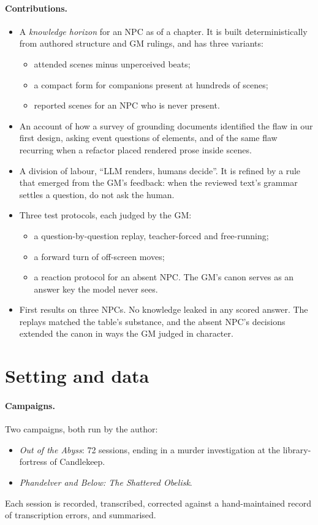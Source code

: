 \documentclass[11pt]{article}
\begin{document}
\paragraph{Contributions.}
\begin{itemize}[nosep]
\item A \emph{knowledge horizon} for an NPC as of a chapter. It is built
deterministically from authored structure and GM rulings, and has three variants:
\begin{itemize}[nosep]
\item attended scenes minus unperceived beats;
\item a compact form for companions present at hundreds of scenes;
\item reported scenes for an NPC who is never present.
\end{itemize}
\item An account of how a survey of grounding documents identified the flaw in our
first design, asking event questions of elements, and of the same flaw recurring when
a refactor placed rendered prose inside scenes.
\item A division of labour, ``LLM renders, humans decide''. It is refined by a rule
that emerged from the GM's feedback: when the reviewed text's grammar settles a
question, do not ask the human.
\item Three test protocols, each judged by the GM:
\begin{itemize}[nosep]
\item a question-by-question replay, teacher-forced and free-running;
\item a forward turn of off-screen moves;
\item a reaction protocol for an absent NPC. The GM's canon serves as an answer key
the model never sees.
\end{itemize}
\item First results on three NPCs. No knowledge leaked in any scored answer. The
replays matched the table's substance, and the absent NPC's decisions extended the
canon in ways the GM judged in character.
\end{itemize}

\section{Setting and data}\label{sec:data}

\paragraph{Campaigns.}
Two campaigns, both run by the author:
\begin{itemize}[nosep]
\item \emph{Out of the Abyss}: 72 sessions, ending in a murder investigation at the
library-fortress of Candlekeep.
\item \emph{Phandelver and Below: The Shattered Obelisk}.
\end{itemize}
Each session is recorded, transcribed, corrected against a hand-maintained record of
transcription errors, and summarised.
\end{document}
